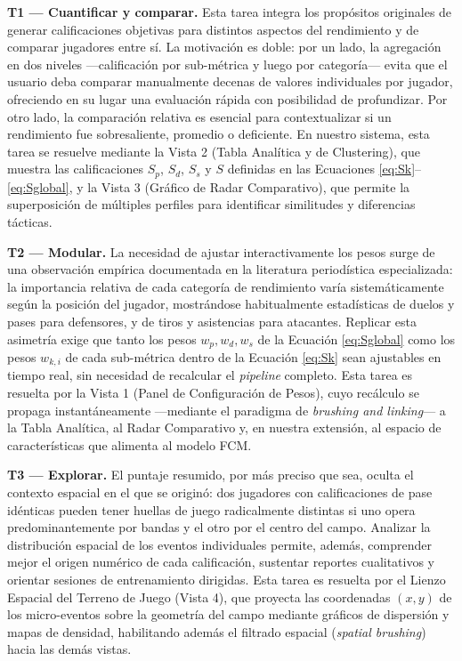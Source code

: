 \documentclass[conference]{IEEEtran}
\begin{document}
\textbf{T1 — Cuantificar y comparar.} Esta tarea integra los propósitos originales de generar calificaciones objetivas para distintos aspectos del rendimiento y de comparar jugadores entre sí. La motivación es doble: por un lado, la agregación en dos niveles —calificación por sub-métrica y luego por categoría— evita que el usuario deba comparar manualmente decenas de valores individuales por jugador, ofreciendo en su lugar una evaluación rápida con posibilidad de profundizar. Por otro lado, la comparación relativa es esencial para contextualizar si un rendimiento fue sobresaliente, promedio o deficiente. En nuestro sistema, esta tarea se resuelve mediante la Vista 2 (Tabla Analítica y de Clustering), que muestra las calificaciones $S_p$, $S_d$, $S_s$ y $S$ definidas en las Ecuaciones \eqref{eq:Sk}--\eqref{eq:Sglobal}, y la Vista 3 (Gráfico de Radar Comparativo), que permite la superposición de múltiples perfiles para identificar similitudes y diferencias tácticas.

\textbf{T2 — Modular.} La necesidad de ajustar interactivamente los pesos surge de una observación empírica documentada en la literatura periodística especializada: la importancia relativa de cada categoría de rendimiento varía sistemáticamente según la posición del jugador, mostrándose habitualmente estadísticas de duelos y pases para defensores, y de tiros y asistencias para atacantes. Replicar esta asimetría exige que tanto los pesos $w_p, w_d, w_s$ de la Ecuación \eqref{eq:Sglobal} como los pesos $w_{k,i}$ de cada sub-métrica dentro de la Ecuación \eqref{eq:Sk} sean ajustables en tiempo real, sin necesidad de recalcular el \textit{pipeline} completo. Esta tarea es resuelta por la Vista 1 (Panel de Configuración de Pesos), cuyo recálculo se propaga instantáneamente —mediante el paradigma de \textit{brushing and linking}— a la Tabla Analítica, al Radar Comparativo y, en nuestra extensión, al espacio de características que alimenta al modelo FCM.

\textbf{T3 — Explorar.} El puntaje resumido, por más preciso que sea, oculta el contexto espacial en el que se originó: dos jugadores con calificaciones de pase idénticas pueden tener huellas de juego radicalmente distintas si uno opera predominantemente por bandas y el otro por el centro del campo. Analizar la distribución espacial de los eventos individuales permite, además, comprender mejor el origen numérico de cada calificación, sustentar reportes cualitativos y orientar sesiones de entrenamiento dirigidas. Esta tarea es resuelta por el Lienzo Espacial del Terreno de Juego (Vista 4), que proyecta las coordenadas $(x,y)$ de los micro-eventos sobre la geometría del campo mediante gráficos de dispersión y mapas de densidad, habilitando además el filtrado espacial (\textit{spatial brushing}) hacia las demás vistas.
\end{document}
